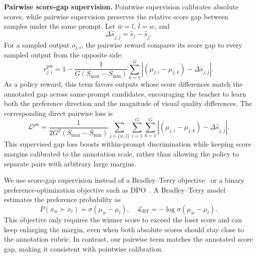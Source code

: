 \documentclass{llmxive}
\begin{document}
\textbf{Pairwise score-gap supervision.}
Pointwise supervision calibrates absolute scores, while pairwise supervision preserves the relative score gap between samples under the same prompt. Let $\bar{w}=l$, $\bar{l}=w$, and
\begin{equation}
\Delta \hat{s}_{j,\bar{j}} = \hat{s}_j - \hat{s}_{\bar{j}}.
\label{eq:score-gap}
\end{equation}
For a sampled output $o_{j,i}$, the pairwise reward compares its score gap to every sampled output from the opposite side:
\begin{equation}
r^{\mathrm{pw}}_{j,i}
=
1 -
\frac{1}{G(S_{\max}-S_{\min})}
\sum_{k=1}^{G}
\left|
(\mu_{j,i}-\mu_{\bar{j},k})-\Delta \hat{s}_{j,\bar{j}}
\right|.
\label{eq:pairwise-reward}
\end{equation}
As a policy reward, this term favors outputs whose score differences match the annotated gap across same-prompt candidates, encouraging the teacher to learn both the preference direction and the magnitude of visual quality differences. The corresponding direct pairwise loss is
\begin{equation}
\mathcal{L}^{\mathrm{pw}}
=
\frac{1}{2G^2(S_{\max}-S_{\min})}
\sum_{j \in \{w,l\}}\sum_{i=1}^{G}\sum_{k=1}^{G}
\left|
(\mu_{j,i}-\mu_{\bar{j},k})-\Delta \hat{s}_{j,\bar{j}}
\right|.
\label{eq:pairwise-loss}
\end{equation}
This supervised gap loss boosts within-prompt discrimination while keeping score margins calibrated to the annotation scale, rather than allowing the policy to separate pairs with arbitrary large margins.

We use score-gap supervision instead of a Bradley--Terry objective~\cite{Bradley1952RANKAO} or a binary preference-optimization objective such as DPO~\cite{rafailov2023direct}. A Bradley--Terry model estimates the preference probability as
\begin{equation}
P(x_w \succ x_l)
=
\sigma(\mu_w-\mu_l),
\quad
\mathcal{L}_{\mathrm{BT}}
=
-\log \sigma(\mu_w-\mu_l).
\label{eq:bt-loss}
\end{equation}
This objective only requires the winner score to exceed the loser score and can keep enlarging the margin, even when both absolute scores should stay close to the annotation rubric. In contrast, our pairwise term matches the annotated score gap, making it consistent with pointwise calibration.
\end{document}
